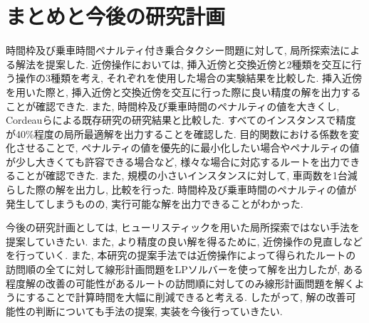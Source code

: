 \chapter{まとめと今後の研究計画}\label{conclution}
時間枠及び乗車時間ペナルティ付き乗合タクシー問題に対して, 局所探索法による解法を提案した. 近傍操作においては, 挿入近傍と交換近傍と2種類を交互に行う操作の3種類を考え, それぞれを使用した場合の実験結果を比較した. 挿入近傍を用いた際と, 挿入近傍と交換近傍を交互に行った際に良い精度の解を出力することが確認できた. また, 時間枠及び乗車時間のペナルティの値を大きくし, Cordeauらによる既存研究の研究結果と比較した. すべてのインスタンスで精度が40\%程度の局所最適解を出力することを確認した. 目的関数における係数を変化させることで, ペナルティの値を優先的に最小化したい場合やペナルティの値が少し大きくても許容できる場合など, 様々な場合に対応するルートを出力できることが確認できた.
また, 規模の小さいインスタンスに対して, 車両数を1台減らした際の解を出力し, 比較を行った. 時間枠及び乗車時間のペナルティの値が発生してしまうものの, 実行可能な解を出力できることがわかった.

今後の研究計画としては, ヒューリスティックを用いた局所探索ではない手法を提案していきたい.
また, より精度の良い解を得るために, 近傍操作の見直しなどを行っていく.
また, 本研究の提案手法では近傍操作によって得られたルートの訪問順の全てに対して線形計画問題をLPソルバーを使って解を出力したが, ある程度解の改善の可能性があるルートの訪問順に対してのみ線形計画問題を解くようにすることで計算時間を大幅に削減できると考える. したがって, 解の改善可能性の判断についても手法の提案, 実装を今後行っていきたい.
